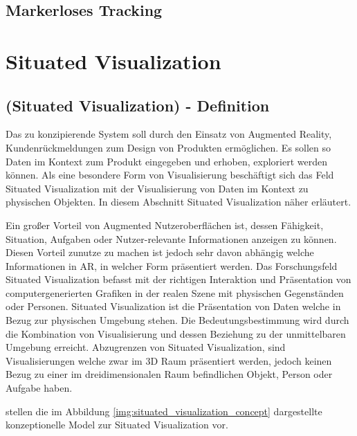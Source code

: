 \subsection{Markerloses Tracking}






\section{Situated Visualization}
\subsection{(Situated Visualization) - Definition}

Das zu konzipierende System soll durch den Einsatz von Augmented Reality, Kundenrückmeldungen zum Design von Produkten ermöglichen. Es sollen so Daten im Kontext zum Produkt eingegeben und erhoben, exploriert werden können. Als eine besondere Form von Visualisierung beschäftigt sich das Feld Situated Visualization mit der Visualisierung von Daten im Kontext zu physischen Objekten. In diesem Abschnitt Situated Visualization
näher erläutert.

\cite[S.~239]{DieterSchmalstieg2016} Ein großer Vorteil von Augmented Nutzeroberflächen ist, dessen Fähigkeit, Situation, Aufgaben oder Nutzer-relevante Informationen anzeigen zu können. 
Diesen Vorteil zunutze zu machen ist jedoch sehr davon abhängig welche Informationen in AR, in welcher Form präsentiert werden. Das Forschungsfeld Situated Visualization befasst mit der richtigen Interaktion und Präsentation von computergenerierten Grafiken in der realen Szene mit physischen Gegenständen oder Personen. \cite[S.~188]{ElSayedNevenA.M.BruceH.ThomasRossT.Smith2015} Situated Visualization ist die Präsentation von Daten welche in Bezug zur physischen Umgebung stehen. Die Bedeutungsbestimmung wird durch die Kombination von Visualisierung und dessen Beziehung zu der unmittelbaren Umgebung erreicht. \cite[S.~240]{DieterSchmalstieg2016} Abzugrenzen von Situated Visualization, sind Visualisierungen welche zwar im 3D Raum präsentiert werden, jedoch keinen Bezug zu einer im dreidimensionalen Raum befindlichen Objekt, Person oder Aufgabe haben.

\cite[S.~192]{ElSayedNevenA.M.BruceH.ThomasRossT.Smith2015} \cite[S.~2]{WesleyWillettYvonneJansen} stellen die im Abbildung \ref{img:situated_visualization_concept} dargestellte konzeptionelle Model zur Situated Visualization vor.

